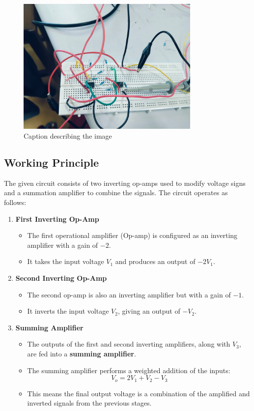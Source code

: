 \documentclass[a4paper,12pt]{article}
\begin{document}
\begin{figure}[H]
    \centering
    \includegraphics[width=0.8\textwidth]{fig/c1.jpeg} %
    \caption{Caption describing the image}
    \label{fig:image_label}
\end{figure}
\subsection{Working Principle}
The given circuit consists of two inverting op-amps used to modify voltage signs and a summation amplifier to combine the signals. The circuit operates as follows:

\begin{enumerate}
    \item \textbf{First Inverting Op-Amp}  
    \begin{itemize}
        \item The first operational amplifier (Op-amp) is configured as an inverting amplifier with a gain of $-2$.
        \item It takes the input voltage $V_1$ and produces an output of $-2V_1$.
    \end{itemize}
    
    \item \textbf{Second Inverting Op-Amp}  
    \begin{itemize}
        \item The second op-amp is also an inverting amplifier but with a gain of $-1$.
        \item It inverts the input voltage $V_2$, giving an output of $-V_2$.
    \end{itemize}
    
    \item \textbf{Summing Amplifier}  
    \begin{itemize}
        \item The outputs of the first and second inverting amplifiers, along with $V_3$, are fed into a \textbf{summing amplifier}.
        \item The summing amplifier performs a weighted addition of the inputs:
        \[
        V_o = 2V_1 + V_2 - V_3
        \]
        \item This means the final output voltage is a combination of the amplified and inverted signals from the previous stages.
    \end{itemize}
\end{enumerate}
\end{document}
